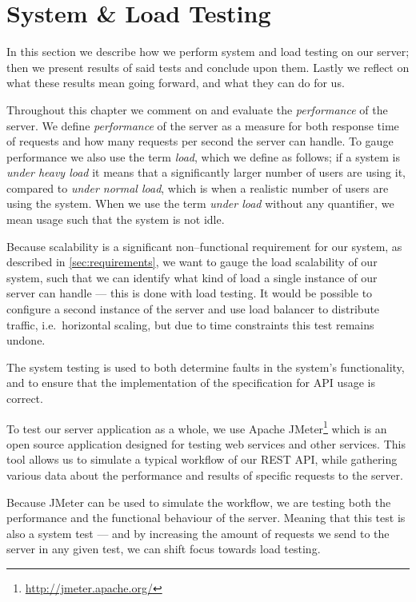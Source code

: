 \section{System \& Load Testing}\label{cha:system_and_load_testing}
In this section we describe how we perform system and load testing on our server;
then we present results of said tests and conclude upon them.
Lastly we reflect on what these results mean going forward, and what they can do for us.

Throughout this chapter we comment on and evaluate the \textit{performance} of the server.
We define \textit{performance} of the server as a measure for both response time of requests and how many requests per second the server can handle.
To gauge performance we also use the term \textit{load}, which we define as follows;
if a system is \textit{under heavy load} it means that a significantly larger number of users are using it, compared to \textit{under normal load}, which is when a realistic number of users are using the system.
When we use the term \textit{under load} without any quantifier, we mean usage such that the system is not idle.

\bigskip
Because scalability is a significant non--functional requirement for our system, as described in \cref{sec:requirements}, we want to gauge the load scalability of our system, such that we can identify what kind of load a single instance of our server can handle --- this is done with load testing. %
It would be possible to configure a second instance of the server and use load balancer to distribute traffic, i.e.~horizontal scaling, but due to time constraints this test remains undone.

The system testing is used to both determine faults in the system's functionality, and to ensure that the implementation of the specification for API usage is correct.

\bigskip
To test our server application as a whole, we use Apache JMeter\footnote{\url{http://jmeter.apache.org/}} which is an open source application designed for testing web services and other services.
This tool allows us to simulate a typical workflow of our REST API, while gathering various data about the performance and results of specific requests to the server.

Because JMeter can be used to simulate the workflow, we are testing both the performance and the functional behaviour of the server.
Meaning that this test is also a system test --- and by increasing the amount of requests we send to the server in any given test, we can shift focus towards load testing.

